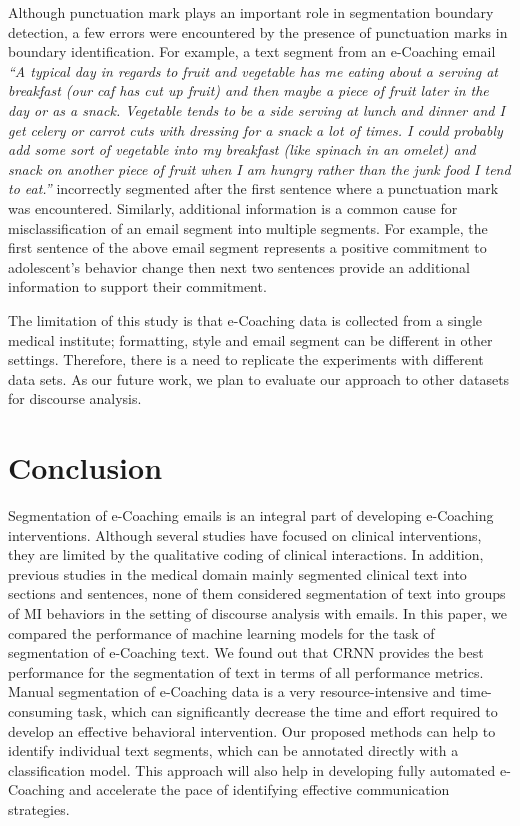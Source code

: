 \documentclass{amia}
\begin{document}
Although punctuation mark plays an important role in segmentation boundary detection, a few errors were encountered by the presence of punctuation marks in boundary identification. For example, a text segment from an e-Coaching email \textit{``A typical day in regards to fruit and vegetable has me eating about a serving at breakfast (our caf has cut up fruit) and then maybe a piece of fruit later in the day or as a snack. Vegetable tends to be a side serving at lunch and dinner and I get celery or carrot cuts with dressing for a snack a lot of times. I could probably add some sort of vegetable into my breakfast (like spinach in an omelet) and snack on another piece of fruit when I am hungry rather than the junk food I tend to eat.''} incorrectly segmented after the first sentence where a punctuation mark was encountered. Similarly, additional information is a common cause for misclassification of an email segment into multiple segments. For example, the first sentence of the above email segment represents a positive commitment to adolescent's behavior change then next two sentences provide an additional information to support their commitment. 

The limitation of this study is that e-Coaching data is collected from a single medical institute; formatting, style and email segment can be different in other settings. Therefore, there is a need to replicate the experiments with different data sets. As our future work, we plan to evaluate our approach to other datasets for discourse analysis. 
 
\section*{Conclusion}
Segmentation of e-Coaching emails is an integral part of developing e-Coaching interventions. Although several studies have focused on clinical interventions, they are limited by the qualitative coding of clinical interactions. In addition, previous studies in the medical domain mainly segmented clinical text into sections and sentences, none of them considered segmentation of text into groups of MI behaviors in the setting of discourse analysis with emails. In this paper, we compared the performance of machine learning models for the task of segmentation of e-Coaching text. We found out that CRNN provides the best performance for the segmentation of text in terms of all performance metrics. Manual segmentation of e-Coaching data is a very resource-intensive and time-consuming task, which can significantly decrease the time and effort required to develop an effective behavioral intervention. Our proposed methods can help to identify individual text segments, which can be annotated directly with a classification model. This approach will also help in developing fully automated e-Coaching and accelerate the pace of identifying effective communication strategies.
\end{document}

